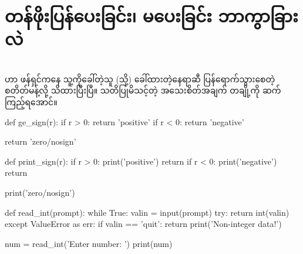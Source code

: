 \section{တန်ဖိုးပြန်ပေးခြင်း၊ မပေးခြင်း ဘာကွာခြားလဲ}

\section{}
 ဟာ ဖန်ရှင်ကနေ သူ့ကိုခေါ်တဲ့သူ (သို့) ခေါ်ထားတဲ့နေရာဆီ ပြန်ရောက်သွားစေတဲ့ စတိတ်မန့်လို့ သိထားပြီးပြီ။ သတိပြုမိသင့်တဲ့ အသေးစိတ်အချက် တချို့ကို ဆက်ကြည့်ရအောင်။ 
%
\begin{py}
def ge_sign(r):
    if r > 0:
        return 'positive'
    if r < 0:
        return 'negative'

    return 'zero/nosign'

def print_sign(r):
    if r > 0:
        print('positive')
        return
    if r < 0:
        print('negative')
        return

    print('zero/nosign')
\end{py}
%


%
\begin{py}
def read_int(prompt):
    while True:
        valin = input(prompt)
        try:
            return int(valin)
        except ValueError as err:
            if valin == 'quit':
                return
            print('Non-integer data!')


num = read_int('Enter number: ')
print(num)
\end{py}
%



